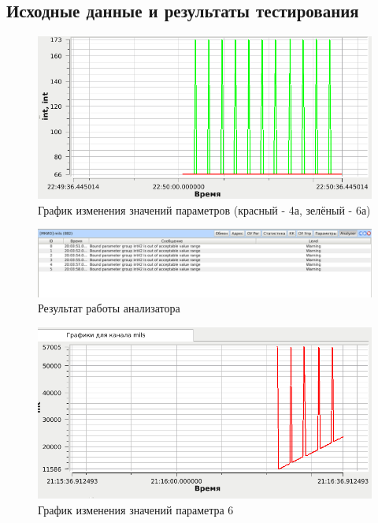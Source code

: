 \subsection{Исходные данные и результаты тестирования}

\begin{figure}[H]
 \centering
 \includegraphics[scale=0.6]{tests/param_bind/graph}
 \caption{График изменения значений параметров (красный - 4а, зелёный - 6а)}
 \label{fig:param_bind_graph}
\end{figure}

\begin{figure}[H]
 \centering
 \includegraphics[scale=0.4]{tests/param_bind/report}
 \caption{Результат работы анализатора}
 \label{fig:param_bind_report}
\end{figure}



\begin{figure}[H]
 \centering
 \includegraphics[scale=0.6]{tests/param_error_value/graph}
 \caption{График изменения значений параметра 6}
 \label{fig:param_error_value_graph}
\end{figure}

